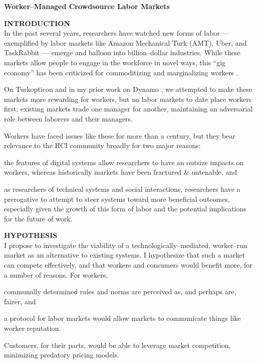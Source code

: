 \documentclass[12pt]{article}
\newcommand{\sectitle}[1]{\textbf{\MakeUppercase{#1}}}
\begin{document}
  \begin{center}
  \large{\bf Worker--Managed Crowdsource Labor Markets}
  \end{center}


\sectitle{introduction}\\
In the past several years, researchers have watched new forms of labor
--- exemplified by labor markets like Amazon Mechanical Turk (AMT), Uber, and TaskRabbit ---
emerge and balloon into billion--dollar industries.
%
While these markets allow people to engage in the workforce in novel ways,
this ``gig economy'' has been criticized for commoditizing
and marginalizing workers
\cite{uberAlgorithm}.

On Turkopticon \cite{turkopticon} and in my prior work on Dynamo \cite{dynamo},
we attempted to make these markets more rewarding for workers,
but no labor markets to date place workers first;
existing markets trade one manager for another, maintaining an adversarial role between laborers and their managers.

Workers have faced issues like these for more than a century,
but they bear relevance to the HCI community broadly for two major reasons:
\begin{inlinelist}
  \item the features of digital systems allow researchers to have an outsize impacts on workers,
  whereas historically markets have been fractured \& untenable,
  and
  \item as researchers of technical systems and social interactions,
  researchers have a prerogative to attempt to steer systems toward more beneficial outcomes,
  especially given the growth of this form of labor and the potential implications for the future of work.
\end{inlinelist}

\sectitle{hypothesis}\\
I propose to investigate the viability of a technologically--mediated,
worker--run market as an alternative to existing systems.
I hypothesize that
such a market can compete effectively,
and that workers and consumers would benefit more, %
for a number of reasons.
For workers,
\begin{inlinelist} %
  \item communally determined rules and norms are perceived as, and perhaps are, fairer, and
  \item a protocol for labor markets would allow markets to communicate things like worker reputation.
\end{inlinelist}
Customers, for their parts, would be able
to leverage market competition, minimizing predatory pricing models.
\end{document}
